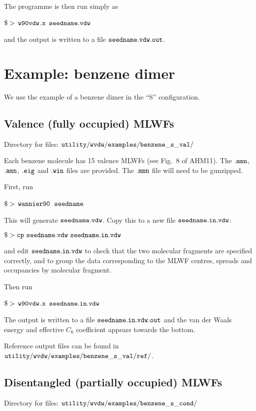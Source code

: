 \documentclass{report}
\newcommand{\wvdw}{{$\tt{w90vdw}$}}
\newcommand{\wannier}{{$\tt{wannier90}$}}
\begin{document}
The programme is then run simply as

$\tt{\$>}$ \wvdw$\tt{.x}$ $\tt{seedname.vdw}$

and the output is written to a file $\tt{seedname.vdw.out}$. 

\section{Example: benzene dimer}

We use the example of a benzene dimer in the ``S''
configuration.

\subsection{Valence (fully occupied) MLWFs}

Directory for files: $\tt{utility/wvdw/examples/benzene\_s\_val/}$

Each benzene molecule has 15 valence MLWFs (see Fig.~8 of AHM11).  The
$\tt{.mmn}$, $\tt{.amn}$, $\tt{.eig}$ and $\tt{.win}$ files are
provided. The $\tt{.mmn}$ file will need to be gunzipped.

First, run 

$\tt{\$>}$ \wannier\ $\tt{seedname}$

This will generate $\tt{seedname.vdw}$. Copy this to a new file
$\tt{seedname.in.vdw}$:

$\tt{\$> cp\ seedname.vdw\ seedname.in.vdw}$

and edit $\tt{seedname.in.vdw}$ to check that the two molecular
fragments are specified correctly, and to group the data corresponding
to the MLWF centres, spreads and occupancies by molecular fragment. 

Then run 

$\tt{\$>}$ \wvdw$\tt{.x}$ $\tt{seedname.in.vdw}$

The output is written to a file $\tt{seedname.in.vdw.out}$ and the van der Waals
energy and effective $C_6$ coefficient appears towards the bottom.

Reference output files can be found in  $\tt{utility/wvdw/examples/benzene\_s\_val/ref/}$.

\subsection{Disentangled (partially occupied) MLWFs}

Directory for files: $\tt{utility/wvdw/examples/benzene\_s\_cond/}$
\end{document}
